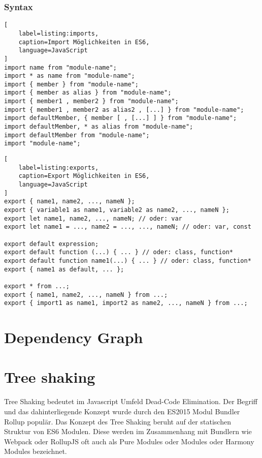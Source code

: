 \subsubsection{Syntax}
\label{subsubsection:Syntax}

\begin{lstlisting}[
    label=listing:imports,
	caption=Import Möglichkeiten in ES6,
	language=JavaScript
]
import name from "module-name";
import * as name from "module-name";
import { member } from "module-name";
import { member as alias } from "module-name";
import { member1 , member2 } from "module-name";
import { member1 , member2 as alias2 , [...] } from "module-name";
import defaultMember, { member [ , [...] ] } from "module-name";
import defaultMember, * as alias from "module-name";
import defaultMember from "module-name";
import "module-name";
\end{lstlisting}

\begin{lstlisting}[
    label=listing:exports,
	caption=Export Möglichkeiten in ES6,
	language=JavaScript
]
export { name1, name2, ..., nameN };
export { variable1 as name1, variable2 as name2, ..., nameN };
export let name1, name2, ..., nameN; // oder: var
export let name1 = ..., name2 = ..., ..., nameN; // oder: var, const

export default expression;
export default function (...) { ... } // oder: class, function*
export default function name1(...) { ... } // oder: class, function*
export { name1 as default, ... };

export * from ...;
export { name1, name2, ..., nameN } from ...;
export { import1 as name1, import2 as name2, ..., nameN } from ...;
\end{lstlisting}

\section{Dependency Graph}

\section{Tree shaking}

Tree Shaking bedeutet im Javascript Umfeld Dead-Code Elimination. Der Begriff und das dahinterliegende Konzept wurde durch den ES2015 Modul Bundler Rollup populär. Das Konzept des Tree Shaking beruht auf der statischen Struktur von ES6 Modulen. Diese werden im Zusammenhang mit Bundlern wie Webpack oder RollupJS oft auch als Pure Modules oder Modules oder Harmony Modules bezeichnet. \autocite{WebpackTreeShaking}

